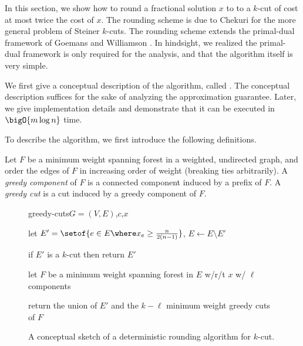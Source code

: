 \documentclass{toc}
\newcommand{\cost}{c} %
\begin{document}

In this section, we show how to round a fractional solution $x$ to
 to a $k$-cut of cost at most twice the cost of
$x$. The rounding scheme is due to Chekuri \etal \cite{cgn-06} for the
more general problem of Steiner $k$-cuts. The rounding scheme extends
the primal-dual framework of Goemans and Williamson
\cite{gw-95,gw-96}. In hindsight, we realized the primal-dual
framework is only required for the analysis, and that the algorithm
itself is very simple.


We first give a conceptual description of the algorithm, called
. The conceptual description suffices for the sake
of analyzing the approximation guarantee. Later, we give
implementation details and demonstrate that it can be executed in
$\bigO{m \log n}$ time.

To describe the algorithm, we first introduce the following
definitions.

\begin{definition}
  Let $F$ be a minimum weight spanning forest in a weighted,
  undirected graph, and order the edges of $F$ in increasing order of
  weight (breaking ties arbitrarily). A \emph{greedy component} of $F$
  is a connected component induced by a prefix of $F$. A \emph{greedy
    cut} is a cut induced by a greedy component of $F$.
\end{definition}


\begin{figure}
  \begin{algorithm}{greedy-cuts}{$G = (V,E)$,$\cost$,$x$} %
  \item let $E' = \setof{e \in E \where x_e \geq \frac{n}{2(n-1)}}$,
    $E \gets E \setminus E'$
  \item if $E'$ is a $k$-cut then return $E'$
  \item let $F$ be a minimum weight spanning forest in $E$ w/r/t $x$
    w/ $\ell$ components
  \item return the union of $E'$ and the $k - \ell$ minimum weight
    greedy cuts of $F$
  \end{algorithm}
  \begin{implicitframed}
    \caption{A conceptual sketch of a deterministic rounding algorithm
      for $k$-cut. }
  \end{implicitframed}
\end{figure}


%
\end{document}
